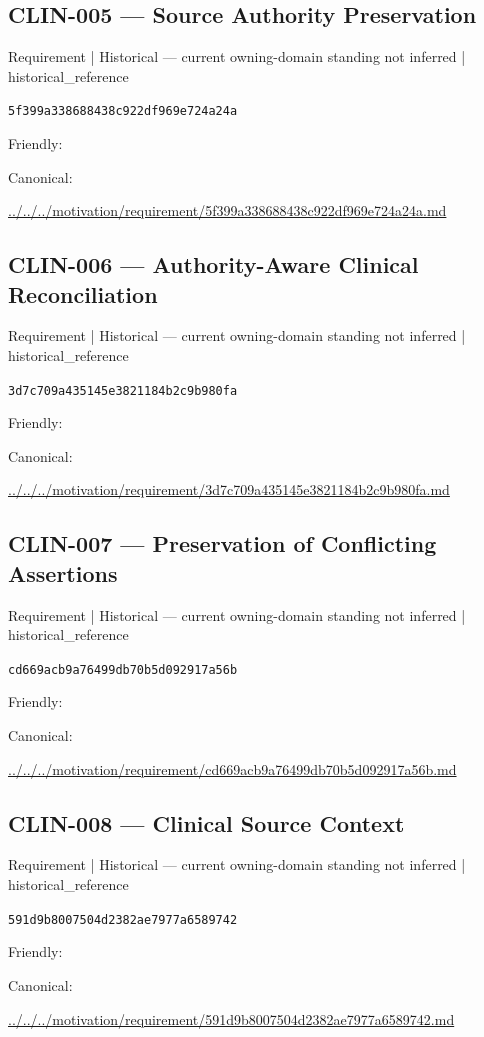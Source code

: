 \documentclass[10pt,a4paper]{article}
\begin{document}
\subsection*{CLIN-005 — Source Authority Preservation}
{\small Requirement | Historical — current owning-domain standing not inferred | historical\_reference}\par
\texttt{5f399a338688438c922df969e724a24a}\par
Friendly: \par
Canonical: \par
{\footnotesize\url{../../../motivation/requirement/5f399a338688438c922df969e724a24a.md}}\par
\subsection*{CLIN-006 — Authority-Aware Clinical Reconciliation}
{\small Requirement | Historical — current owning-domain standing not inferred | historical\_reference}\par
\texttt{3d7c709a435145e3821184b2c9b980fa}\par
Friendly: \par
Canonical: \par
{\footnotesize\url{../../../motivation/requirement/3d7c709a435145e3821184b2c9b980fa.md}}\par
\subsection*{CLIN-007 — Preservation of Conflicting Assertions}
{\small Requirement | Historical — current owning-domain standing not inferred | historical\_reference}\par
\texttt{cd669acb9a76499db70b5d092917a56b}\par
Friendly: \par
Canonical: \par
{\footnotesize\url{../../../motivation/requirement/cd669acb9a76499db70b5d092917a56b.md}}\par
\subsection*{CLIN-008 — Clinical Source Context}
{\small Requirement | Historical — current owning-domain standing not inferred | historical\_reference}\par
\texttt{591d9b8007504d2382ae7977a6589742}\par
Friendly: \par
Canonical: \par
{\footnotesize\url{../../../motivation/requirement/591d9b8007504d2382ae7977a6589742.md}}\par
\end{document}
